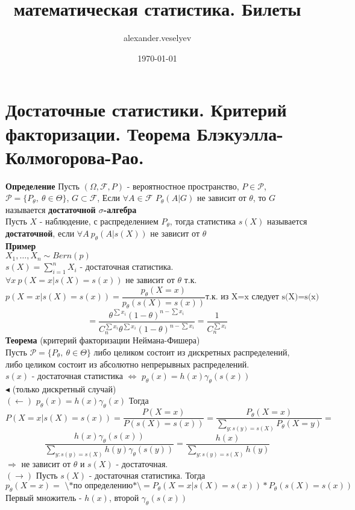 \documentclass{article}
\title{математическая статистика. Билеты}
\author{alexander.veselyev }
\date{\today}
\begin{document}
\section{Достаточные статистики. Критерий факторизации. Теорема Блэкуэлла-Колмогорова-Рао.}

\textbf{Определение} Пусть $(\Omega, \mathcal{F}, P)$ - вероятностное пространство, $P\in\mathcal{P}$,
$\mathcal{P}=\{P_\theta,\ \theta\in\Theta\}$, $G\subset\mathcal{F}$, Если $\forall A\in\mathcal{F}$ $P_\theta(A|G)$ не зависит от $\theta$, то $G$ называется \textbf{достаточной $\sigma$-алгебра} \\
Пусть $X$ - наблюдение, с распределением $P_\theta$, тогда статистика $s(X)$ называется \textbf{достаточной}, если $\forall A\ p_\theta(A|s(X))$ не зависит от $\theta$\\
\textbf{Пример}\\
$X_1,\dots,X_n \sim Bern(p)$\\
$s(X) = \sum_{i=1}^n{X_i}$ - достаточная статистика.\\
$\forall x\ p(X=x|s(X)=s(x))$ не зависит от $\theta$ т.к.\\
$$ p(X=x|s(X)=s(x)) = \frac{p_\theta(X=x)}{p_\theta(s(X)=s(x))} \text{т.к. из X=x следует s(X)=s(x)}$$  $$= \frac{\theta^{\sum{x_i}}(1-\theta)^{n-\sum{x_i}}}{C_n^{\sum{x_i}}\theta^{\sum{x_i}}(1-\theta)^{n-\sum{x_i}}} = \frac{1}{C_n^{\sum{x_i}}}$$
\textbf{Теорема} (критерий факторизации Неймана-Фишера)\\
Пусть $\mathcal{P}=\{P_\theta,\ \theta\in\Theta\}$ либо целиком состоит из дискретных распределений, либо целиком состоит из абсолютно непрерывных распределений.\\
$s(x)$ - достаточная статистика $\Leftrightarrow$ $p_\theta(x) = h(x)\gamma_\theta(s(x))$\\
$\blacktriangleleft$ (только дискретный случай)\\
$(\leftarrow)$ $p_\theta(x) = h(x)\gamma_\theta(x)$ Тогда $$P(X=x|s(X) = s(x)) = \frac{P(X=x)}{P(s(X)=s(x))} = \frac{P_\theta(X=x)}{\sum_{y: s(y) = s(X)}{P_\theta(X=y)}} = $$ $$
\frac{h(x)\gamma_\theta(s(x))}{\sum_{y: s(y) = s(X)}h(y)\gamma_\theta(s(y))}
 = \frac{h(x)}{\sum_{y: s(y) = s(X)}h(y)}$$
$\Rightarrow$ не зависит от $\theta$ и $s(X)$ - достаточная.\\
$(\rightarrow)$ Пусть $s(X)$ - достаточная статистика. Тогда\\
$$ p_\theta(X = x) = \text{ \textbackslash *по определению*\textbackslash } = P_\theta(X=x|s(X) = s(x))*P_\theta(s(X)=s(x))$$
Первый множитель - $h(x)$, второй $\gamma_\theta(s(x))$\\
\end{document}
